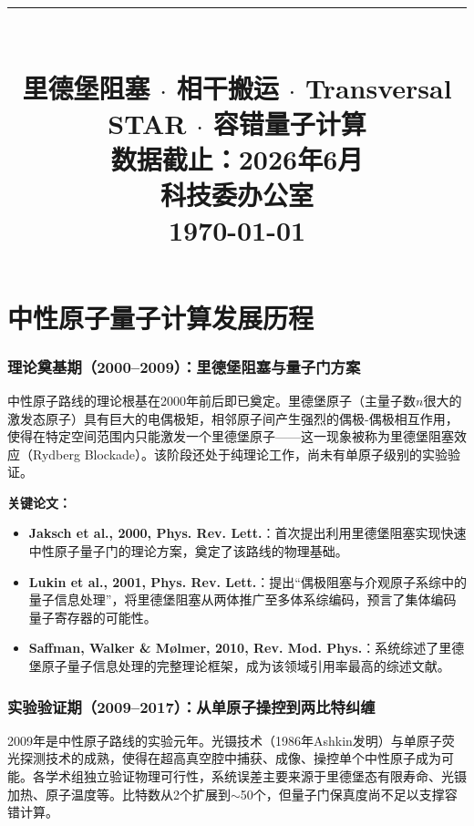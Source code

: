 \documentclass[11pt,a4paper]{ctexart}
\title{\vspace{2cm}{\Huge\bfseries\color{mainred} 中性原子量子计算发展历程\\[6pt] 与QuEra技术脉络梳理}\\[16pt]\rule{0.5\textwidth}{1.5pt}\\[12pt]{\large 里德堡阻塞 $\cdot$ 相干搬运 $\cdot$ Transversal STAR $\cdot$ 容错量子计算}\\[8pt]{\footnotesize\color{graytext}数据截止：2026年6月}\\[8pt]{\large 科技委办公室}\\[16pt]{\large\color{graytext}\today}}
\date{}
\begin{document}
\maketitle\thispagestyle{empty}
\newpage\tableofcontents\newpage

\part{中性原子量子计算发展历程}

\section{理论奠基期（2000--2009）：里德堡阻塞与量子门方案}

中性原子路线的理论根基在2000年前后即已奠定。里德堡原子（主量子数$n$很大的激发态原子）具有巨大的电偶极矩，相邻原子间产生强烈的偶极-偶极相互作用，使得在特定空间范围内只能激发一个里德堡原子——这一现象被称为里德堡阻塞效应（Rydberg Blockade）。该阶段还处于纯理论工作，尚未有单原子级别的实验验证。

\textbf{关键论文：}
\begin{itemize}
\item \textbf{Jaksch et al., 2000, Phys. Rev. Lett.}：首次提出利用里德堡阻塞实现快速中性原子量子门的理论方案，奠定了该路线的物理基础。
\item \textbf{Lukin et al., 2001, Phys. Rev. Lett.}：提出``偶极阻塞与介观原子系综中的量子信息处理''，将里德堡阻塞从两体推广至多体系综编码，预言了集体编码量子寄存器的可能性。
\item \textbf{Saffman, Walker \& M\o lmer, 2010, Rev. Mod. Phys.}：系统综述了里德堡原子量子信息处理的完整理论框架，成为该领域引用率最高的综述文献。
\end{itemize}

\section{实验验证期（2009--2017）：从单原子操控到两比特纠缠}

2009年是中性原子路线的实验元年。光镊技术（1986年Ashkin发明）与单原子荧光探测技术的成熟，使得在超高真空腔中捕获、成像、操控单个中性原子成为可能。各学术组独立验证物理可行性，系统误差主要来源于里德堡态有限寿命、光镊加热、原子温度等。比特数从2个扩展到$\sim$50个，但量子门保真度尚不足以支撑容错计算。
\end{document}
